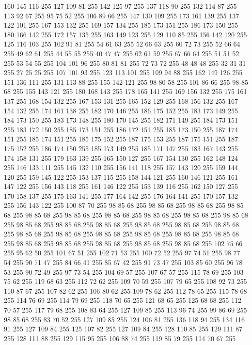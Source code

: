 160 145 116 255 127 109 81 255 142 125 97 255 137 118 90 255 132 114 87 255 113 92 67 255 95 75 52 255 106 89 66 255 147 130 109 255 173 161 139 255 137 122 101 255 167 153 132 255 169 157 134 255 185 173 151 255 186 173 150 255 180 166 142 255 172 157 135 255 163 149 123 255 129 110 85 255 156 142 120 255 125 116 103 255 102 91 81 255 54 61 63 255 52 66 63 255 60 72 73 255 52 66 64 255 49 62 61 255 44 55 55 255 40 47 47 255 62 61 59 255 67 66 64 255 51 51 52 255 53 54 55 255 104 101 96 255 80 81 81 255 72 73 72 255 48 48 48 255 32 31 31 255 27 25 25 255 107 101 93 255 123 113 101 255 109 94 88 255 162 149 126 255 151 136 111 255 131 113 88 255 155 142 121 255 98 80 58 255 101 86 66 255 98 85 68 255 155 143 121 255 180 168 143 255 178 165 141 255 169 156 132 255 175 161 137 255 168 154 132 255 167 153 131 255 165 152 129 255 168 156 132 255 167 154 132 255 174 161 138 255 182 170 146 255 186 175 152 255 183 173 149 255 184 173 150 255
183 173 148 255 180 170 145 255 182 171 149 255 184 173 151 255 183 172 150 255 185 173 151 255 186 172 151 255 185 173 150 255 187 174 151 255 185 174 151 255 185 175 152 255 187 175 153 255 187 175 151 255 187 175 152 255 186 174 150 255 185 173 149 255 185 171 147 255 183 167 143 255 174 158 131 255 179 163 139 255 165 150 127 255 167 154 130 255 162 148 124 255 146 133 111 255 145 132 110 255 156 141 118 255 157 143 120 255 159 144 120 255 159 145 122 255 153 137 115 255 158 144 121 255 160 146 121 255 161 147 122 255 156 143 118 255 161 146 122 255 153 139 116 255 162 150 127 255 170 158 137 255 175 163 141 255 177 164 142 255 176 164 141 255 170 157 132 255 156 143 122 255 100 87 70 255 98 85 68 255 98 85 68 255 98 85 68 255 98 85 68 255 98 85 68 255 98 85 68 255 98 85 68 255 98 85 68 255 98 85 68 255 98 85 68 255 98 85 68 255 98 85 68 255 98 85 68 255 98 85 68 255 98 85 68 255 98 85 68 255 98 85 68 255 98 85 68 255 98 85 68 255 98 85 68 255
98 85 68 255 98 85 68 255 98 85 68 255 98 85 68 255 98 85 68 255 98 85 68 255 98 85 68 255 102 75 66 255 95 62 50 255 101 67 51 255 102 71 53 255 100 72 52 255 97 74 51 255 98 77 54 255 90 71 47 255 84 66 41 255 85 67 42 255 91 73 47 255 103 85 60 255 96 78 53 255 90 72 49 255 97 73 54 255 104 69 57 255 107 67 57 255 115 78 69 255 103 75 62 255 119 68 63 255 112 72 62 255 109 70 59 255 107 79 65 255 108 92 73 255 110 87 67 255 107 82 62 255 106 80 62 255 109 78 62 255 112 78 65 255 115 78 68 255 114 76 69 255 114 79 69 255 118 70 65 255 121 68 65 255 125 68 68 255 112 70 57 255 117 79 68 255 108 83 64 255 127 109 85 255 113 96 74 255 99 86 69 255 98 85 68 255 83 70 52 255 127 109 85 255 124 106 81 255 136 118 94 255 134 116 91 255 127 109 84 255 125 107 82 255 127 109 84 255 128 110 85 255 129 111 87 255 128 111 88 255 129 115 95 255 106 88 74 255 119 85 79 255 114 70 67 255
